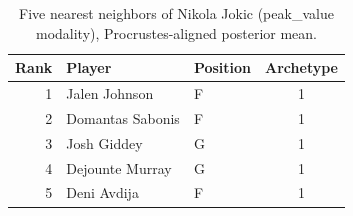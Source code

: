 \begin{table}[htbp]
  \centering\small
  \begin{tabular}{rllc}
    \toprule
    Rank & Player & Position & Archetype \\
    \midrule
    1 & Jalen Johnson & F & 1 \\
    2 & Domantas Sabonis & F & 1 \\
    3 & Josh Giddey & G & 1 \\
    4 & Dejounte Murray & G & 1 \\
    5 & Deni Avdija & F & 1 \\
    \bottomrule
  \end{tabular}
  \caption{Five nearest neighbors of Nikola Jokic (peak_value modality), Procrustes-aligned posterior mean.}
  \label{tab:Nikola_Jokic_neighbors_peak_value}
\end{table}

